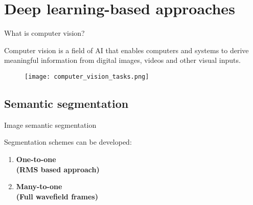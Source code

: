 \documentclass[10pt,aspectratio=169,dvipsnames]{beamer} %
\begin{document}
\section{Deep learning-based approaches}
\setcounter{subfigure}{0}
\begin{frame}{What is computer vision?}
	\begin{minipage}[c]{0.30\textwidth}
		Computer vision is a field of AI that enables computers and systems to derive meaningful information from digital images, videos and other visual inputs. 
	\end{minipage}
	\hfill
	\begin{minipage}[c]{0.65\textwidth}
		\begin{figure}
			\centering
			\texttt{[image: computer\_vision\_tasks.png]}
		\end{figure}
	\end{minipage}
\end{frame}
\subsection{Semantic segmentation}
\setcounter{subfigure}{0}
\begin{frame}{Image semantic segmentation}
	\begin{minipage}[l]{0.35\textwidth}
		Segmentation schemes can be developed:
		\medskip
		\begin{enumerate}
			\item \textbf{One-to-one \\(RMS based approach)} 
			\medskip
			\item \textbf{Many-to-one \\(Full wavefield frames)}
		\end{enumerate}
	\end{minipage}
	\begin{minipage}[l]{0.6\textwidth}
		\begin{figure}
			\centering
			\qquad
			\qquad
			\\
			\qquad
			
		\end{figure}
	\end{minipage}
\end{frame}
\end{document}

